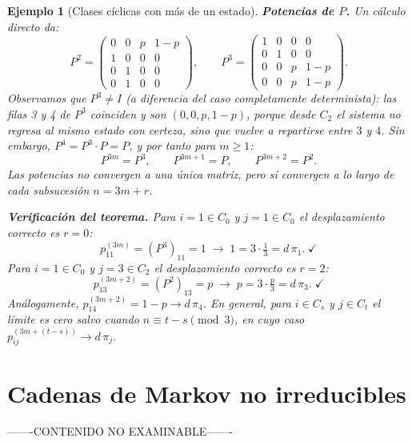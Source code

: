 \documentclass[12pt]{book}
\newtheorem{example}{Ejemplo}[chapter]
\begin{document}
\begin{example}[Clases cíclicas con más de un estado]
    \smallskip
    \textbf{Potencias de $P$.} Un cálculo directo da:
    \[
        P^2 = \begin{pmatrix}
            0 & 0 & p   & 1-p \\
            1 & 0 & 0   & 0   \\
            0 & 1 & 0   & 0   \\
            0 & 1 & 0   & 0
        \end{pmatrix}, \qquad
        P^3 = \begin{pmatrix}
            1 & 0 & 0   & 0   \\
            0 & 1 & 0   & 0   \\
            0 & 0 & p   & 1-p \\
            0 & 0 & p   & 1-p
        \end{pmatrix}.
    \]
    Observamos que $P^3 \neq I$ (a diferencia del caso completamente determinista): las filas 3 y 4 de $P^3$ coinciden y son $(0,0,p,1-p)$, porque desde $C_2$ el sistema no regresa al mismo estado con certeza, sino que vuelve a repartirse entre $3$ y $4$.  Sin embargo, $P^4 = P^3\cdot P = P$, y por tanto para $m \geq 1$:
    \[
        P^{3m} = P^3, \qquad P^{3m+1} = P, \qquad P^{3m+2} = P^2.
    \]
    Las potencias no convergen a una única matriz, pero \emph{sí} convergen a lo largo de cada subsucesión $n = 3m + r$.

    \smallskip
    \textbf{Verificación del teorema.} Para $i = 1 \in C_0$ y $j = 1 \in C_0$ el desplazamiento correcto es $r = 0$:
    \[
        p_{11}^{(3m)} = (P^3)_{11} = 1 \;\longrightarrow\; 1 = 3\cdot\tfrac{1}{3} = d\,\pi_1. \;\checkmark
    \]
    Para $i=1 \in C_0$ y $j = 3 \in C_2$ el desplazamiento correcto es $r = 2$:
    \[
        p_{13}^{(3m+2)} = (P^2)_{13} = p \;\longrightarrow\; p = 3\cdot\tfrac{p}{3} = d\,\pi_3. \;\checkmark
    \]
    Análogamente, $p_{14}^{(3m+2)} = 1-p \to d\,\pi_4$. En general, para $i \in C_s$ y $j \in C_t$ el límite es cero salvo cuando $n \equiv t-s \pmod{3}$, en cuyo caso $p_{ij}^{(3m+(t-s))} \to d\,\pi_j$.
\end{example}

\section{Cadenas de Markov no irreducibles}
\begin{center}
    
\color{blue} -------CONTENIDO NO EXAMINABLE------- \color{black}

\end{center}
\end{document}
